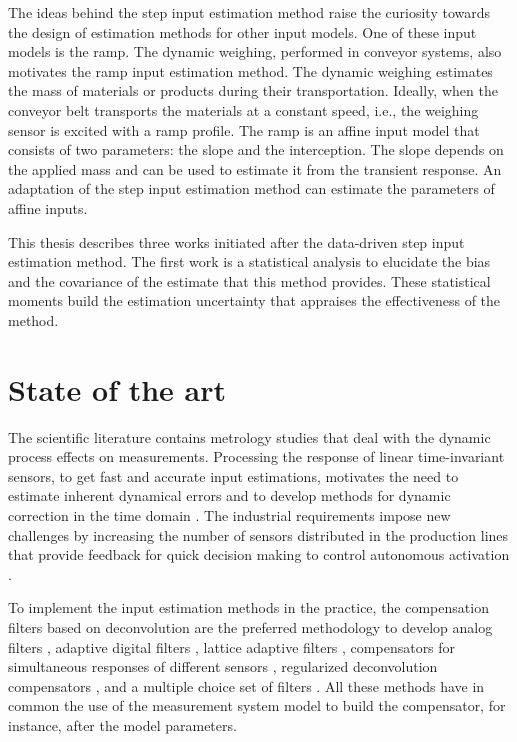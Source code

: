 The ideas behind the step input estimation method raise the curiosity towards the design of estimation methods for other input models.
One of these input models is the ramp.
The dynamic weighing, performed in conveyor systems, also motivates the ramp input estimation method.
The dynamic weighing estimates the mass of materials or products during their transportation.
Ideally, when the conveyor belt transports the materials at a constant speed, i.e., the weighing sensor is excited with a ramp profile. 
The ramp is an affine input model that consists of two parameters: the slope and the interception.
The slope depends on the applied mass and can be used to estimate it from the transient response.
An adaptation of the step input estimation method can estimate the parameters of affine inputs.

This thesis describes three works initiated after the data-driven step input estimation method.
The first work is a statistical analysis to elucidate the bias and the covariance of the estimate that this method provides.
These statistical moments build the estimation uncertainty that appraises the effectiveness of the method.
   
 
\section{State of the art}

The scientific literature contains metrology studies that deal with the dynamic process effects on measurements.
Processing the response of linear time-invariant sensors, to get fast and accurate input estimations, motivates the need to estimate inherent dynamical errors \citep{Hessling06} and to develop methods for dynamic correction in the time domain \citep{Hessling08a}.
The industrial requirements impose new challenges by increasing the number of sensors distributed in the production lines that provide feedback for quick decision making to control autonomous activation \citep{Esward09}.  

To implement the input estimation methods in the practice, the compensation filters based on deconvolution \citep{Eichstadt10} are the preferred methodology to develop 
analog filters \citep{Jafaripanah05}, 
adaptive digital filters \citep{Shu93}, 
lattice adaptive filters \citep{Hernandez06}, 
compensators for simultaneous responses of different sensors \citep{Boschetti13}, 
regularized deconvolution compensators \citep{Dienstfrey14}, 
and a multiple choice set of filters \citep{Huang16}. 
All these methods have in common the use of the measurement system model to build the compensator, for instance, after the model parameters.


